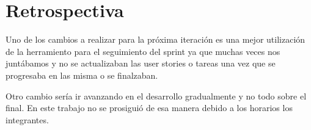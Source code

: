 \section{Retrospectiva}

Uno de los cambios a realizar para la próxima iteración es una mejor utilización
de la herramiento para el seguimiento del sprint ya que muchas veces nos juntábamos
y no se actualizaban las user stories o tareas una vez que se progresaba en las misma o se 
finalzaban.


Otro cambio sería ir avanzando en el desarrollo gradualmente y no todo sobre el final. 
En este trabajo no se prosiguió de esa manera debido a los horarios los integrantes.



